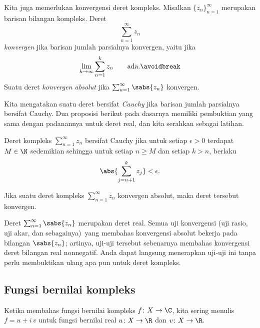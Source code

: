 Kita juga memerlukan konvergensi deret kompleks. Misalkan $\{ z_n \}_{n=1}^\infty$ merupakan
barisan bilangan kompleks. Deret
\begin{equation*}
\sum_{n=1}^\infty z_n
\end{equation*}
\emph{konvergen} jika barisan jumlah parsialnya konvergen, yaitu jika
\begin{equation*}
\lim_{k\to\infty} \sum_{n=1}^k z_n \qquad \text{ada.}
\avoidbreak
\end{equation*}
Suatu deret \emph{konvergen absolut}
jika $\sum_{n=1}^\infty \sabs{z_n}$ konvergen.

Kita mengatakan suatu deret
bersifat \emph{Cauchy}
jika barisan jumlah parsialnya bersifat Cauchy. Dua
proposisi berikut pada dasarnya memiliki pembuktian yang sama
dengan padanannya untuk deret real, dan
kita serahkan sebagai latihan.

\begin{prop} \label{prop:cachysercomplex}
Deret kompleks $\sum_{n=1}^\infty z_n$ bersifat Cauchy jika untuk setiap $\epsilon > 0$
terdapat $M \in \N$ sedemikian sehingga untuk setiap $n \geq M$
dan setiap $k > n$, berlaku
\begin{equation*}
\abs{ \sum_{j={n+1}}^k z_j }
< \epsilon .
\end{equation*}
\end{prop}

\begin{prop} \label{prop:absconvmeansconv}
Jika suatu deret kompleks $\sum_{n=1}^\infty z_n$ konvergen absolut, maka deret tersebut konvergen.
\end{prop}

Deret $\sum_{n=1}^\infty \sabs{z_n}$ merupakan deret real. Semua
uji konvergensi (uji rasio, uji akar, dan sebagainya)\ yang membahas
konvergensi absolut bekerja pada bilangan $\sabs{z_n}$; artinya, uji-uji tersebut
sebenarnya membahas konvergensi deret bilangan real nonnegatif.
Anda dapat langsung menerapkan uji-uji ini
tanpa perlu membuktikan ulang apa pun untuk deret kompleks.

\subsection{Fungsi bernilai kompleks}

Ketika membahas fungsi bernilai kompleks
$f \colon X \to \C$, kita sering menulis
$f = u+i\,v$ untuk fungsi bernilai real $u \colon X \to \R$ dan $v \colon X \to
\R$.

